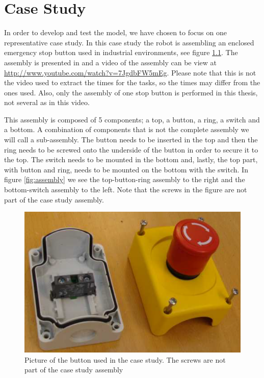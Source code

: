 \chapter{Case Study}\label{cha:assembly}
In order to develop and test the model, we have chosen to focus on one representative case study. In this case study the robot is assembling an enclosed emergency stop button used in industrial environments, see figure \ref{fig:button}. The assembly is presented in \cite{assembly} and a video of the assembly can be view at \url{http://www.youtube.com/watch?v=7JgdbFW5mEg}. Please note that this is not the video used to extract the times for the tasks, so the times may differ from the ones used. Also, only the assembly of one stop button is performed in this thesis, not several as in this video.

This assembly is composed of 5 components; a top, a button, a ring, a switch and a bottom. A combination of components that is not the complete assembly we will call a sub-assembly. The button needs to be inserted in the top and then the ring needs to be screwed onto the underside of the button in order to secure it to the top. The switch needs to be mounted in the bottom and, lastly, the top part, with button and ring, needs to be mounted on the bottom with the switch. In figure \ref{fig:assembly} we see the top-button-ring assembly to the right and the bottom-switch assembly to the left. Note that the screws in the figure are not part of the case study assembly.

\begin{figure}
\centering
\includegraphics[width=\textwidth/3*2]{Figures/buttonbox.png}
\caption{Picture of the button used in the case study. The screws are not part of the case study assembly}
\label{fig:button}
\end{figure}

